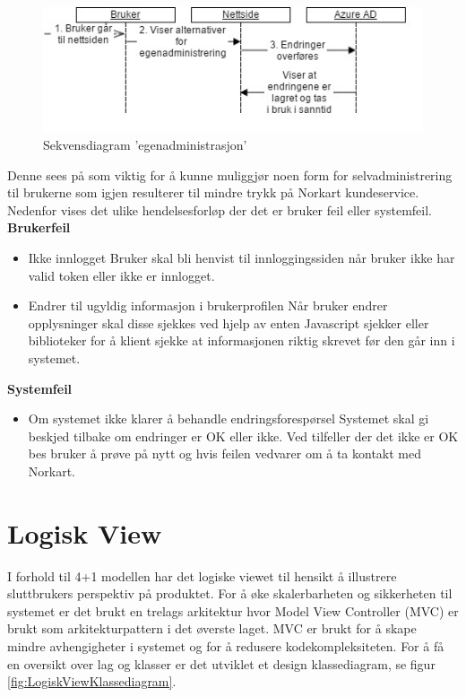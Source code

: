 \begin{figure}[H]
    \centering
    \includegraphics[scale=0.55]{graphics/04-arkitektur/UseCaseSekveknsdiagramEgenadministrasjon.jpg}
    \caption{Sekvensdiagram 'egenadministrasjon'}
    \label{fig:skevensdiagramEgenadministrasjon}
\end{figure}

\noindent Denne sees på som viktig for å kunne muliggjør noen form for selvadministrering til brukerne som igjen resulterer til mindre trykk på Norkart kundeservice.
\newline
\newline Nedenfor vises det ulike hendelsesforløp der det er bruker feil eller systemfeil.
\newline
\newline \textbf{Brukerfeil}
\begin{itemize}
\item Ikke innlogget
\newline Bruker skal bli henvist til innloggingssiden når bruker ikke har valid token eller ikke er innlogget.
\item Endrer til ugyldig informasjon i brukerprofilen
\newline Når bruker endrer opplysninger skal disse sjekkes ved hjelp av enten Javascript sjekker eller biblioteker for å klient sjekke at informasjonen riktig skrevet før den går inn i systemet. 
\end{itemize}

\bigskip \textbf{Systemfeil}
\begin{itemize}
\item Om systemet ikke klarer å behandle endringsforespørsel
\newline Systemet skal gi beskjed tilbake om endringer er OK eller ikke. Ved tilfeller der det ikke er OK bes bruker å prøve på nytt og hvis feilen vedvarer om å ta kontakt med Norkart.
\end{itemize}

\section{Logisk View}
\label{sec:logisk_view}
I forhold til 4+1 modellen har det logiske viewet til hensikt å illustrere sluttbrukers perspektiv på produktet. For å øke skalerbarheten og sikkerheten til systemet er det brukt en trelags arkitektur hvor Model View Controller (MVC) er brukt som arkitekturpattern i det øverste laget. MVC er brukt for å skape mindre avhengigheter i systemet og for å redusere kodekompleksiteten. For å få en oversikt over lag og klasser er det utviklet et design klassediagram, se figur \ref{fig:LogiskViewKlassediagram}.

